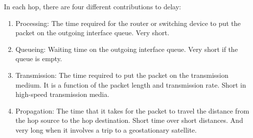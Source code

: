 In each hop, there are four different contributions to delay:
\begin{enumerate}
\item Processing: The time required for the router or switching device to put the packet on the outgoing interface queue.
Very short.
\item Queueing: Waiting time on the outgoing interface queue.
Very short if the queue is empty.
\item Transmission: The time required to put the packet on the transmission medium. It is a function of the packet length and transmission rate.
Short in high-speed transmission media.
\item Propagation: The time that it takes for the packet to travel the distance from the hop source to the hop destination.
Short time over short distances. 
And very long when it involves a trip to a geostationary satellite.
\end{enumerate}

